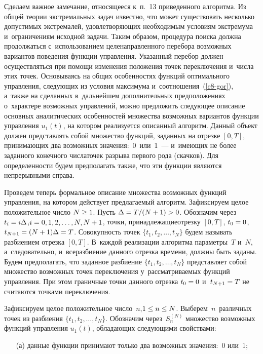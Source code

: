 \begin{multicols}{2}
Сделаем важное замечание, относящееся к~п.~13 приведенного алгоритма. Из общей 
тео\-рии экстремальных задач известно, что может существовать несколько допустимых 
экстремалей, удовле\-тво\-ря\-ющих необходимым условиям экстремума 
\mbox{и~ограничениям} исходной 
задачи. Таким образом, процедура поиска должна продолжаться с~использованием 
целенаправленного перебора возможных вариантов поведения функции управ\-ле\-ния. 
Указанный перебор должен осуществляться при помощи изменения положения точек 
переключения и~чис\-ла этих точек. Основываясь на общих особенностях функций 
оптимального управления, следующих из условия максимума и~соотношения~(\ref{e8-gor}), 
а~так\-же на сделанных в~дальнейшем дополнительных предположениях о~характере возможных 
управ\-ле\-ний, можно предложить следующее описание основных аналитических особенностей 
множества возможных вариантов функции управления $u_1(t)$, на котором реализуется 
описанный алгоритм. Данный объект должен представлять собой мно\-жество функций, 
заданных на отрезке $[0,T]$, при\-ни\-ма\-ющих два возможных значения:~0~или~1~--- 
и~имеющих не более заданного конечного чис\-ла\linebreak точек разрыва первого рода (скачков). 
Для определенности будем предполагать также, что эти функции являются непрерывными 
справа.

Проведем теперь формальное описание множества возможных функций управления, 
на котором действует предлагаемый алгоритм.
Зафиксируем целое положительное число $N \hm\geq 1$. Пусть $\Delta \hm= {T}/({N+1})\hm > 0$. 
Обозначим через $t_i \hm= i \Delta$,\linebreak $i\hm=0,1,2,\ldots,N,N+1$,  точки, 
принадлежащие\linebreak отрезку $[0,T]$, $t_0\hm=0$, $t_{N+1}\hm=(N+1) \Delta \hm= T$. 
Совокупность точек $\{t_1,t_2,\ldots,t_N\}$ будем называть раз\-би\-ени\-ем отрезка $[0,T]$. 
В~каждой реализации алгоритма параметры~$T$ и~$N$, а~следовательно, и~все\linebreak раз\-би\-ение 
данного отрезка времени, должны быть заданы. Будем предполагать, что заданное 
разбиение $\{t_1,t_2,\ldots,t_N\}$ представляет собой мно\-жест\-во возможных точек 
переключения у~рас\-смат\-ри\-ва\-емых функций управления.  При этом граничные точки данного 
отрезка $t_0\hm=0$ и~$t_{N+1}\hm=T$ не считаются точками переключения.

Зафиксируем целое положительное число~$n$,\linebreak $1 \hm\leq n \hm\leq N$. Выберем~$n$~различных 
точек из разбиения $\{ t_1, t_2,\ldots, t_N  \}$. Обозначим через~$S^{(N)}_n$ множество 
возможных функций управления $u_1(t)$, обла\-да\-ющих следующими свойствами:
\begin{itemize}
\item[(а)] данные функции принимают только два возможных значения:~0 или~1;


\end{itemize}
\end{multicols}
